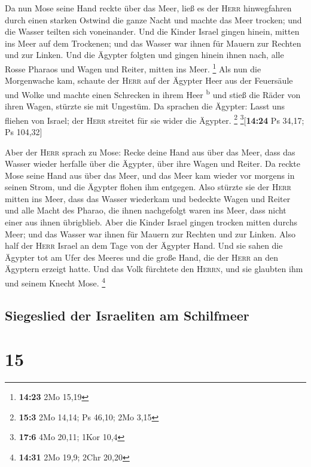  Da nun Mose seine Hand reckte über das Meer, ließ es der
\textsc{Herr} hinwegfahren durch einen starken Ostwind die ganze Nacht
und machte das Meer trocken; und die Wasser teilten sich voneinander.
 Und die Kinder Israel gingen hinein, mitten ins Meer auf
dem Trockenen; und das Wasser war ihnen für Mauern zur Rechten und zur
Linken.  Und die Ägypter folgten und gingen hinein ihnen
nach, alle Rosse Pharaos und Wagen und Reiter, mitten ins Meer.
\footnote{\textbf{14:23} 2Mo 15,19}  Als nun die
Morgenwache kam, schaute der \textsc{Herr} auf der Ägypter Heer aus der
Feuersäule und Wolke und machte einen Schrecken in ihrem Heer
\textsuperscript{b}  und stieß die Räder von ihren Wagen,
stürzte sie mit Ungestüm. Da sprachen die Ägypter: Lasst uns fliehen von
Israel; der \textsc{Herr} streitet für sie wider die Ägypter.
\footnote{\textbf{15:3} 2Mo 14,14; Ps 46,10; 2Mo 3,15}
\footnote{\textbf{17:6} 4Mo 20,11; 1Kor 10,4}{[}\textbf{14:24} Ps 34,17;
Ps 104,32{]}

 Aber der \textsc{Herr} sprach zu Mose: Recke deine Hand
aus über das Meer, dass das Wasser wieder herfalle über die Ägypter,
über ihre Wagen und Reiter.  Da reckte Mose seine Hand
aus über das Meer, und das Meer kam wieder vor morgens in seinen Strom,
und die Ägypter flohen ihm entgegen. Also stürzte sie der \textsc{Herr}
mitten ins Meer,  dass das Wasser wiederkam und bedeckte
Wagen und Reiter und alle Macht des Pharao, die ihnen nachgefolgt waren
ins Meer, dass nicht einer aus ihnen übrigblieb.  Aber
die Kinder Israel gingen trocken mitten durchs Meer; und das Wasser war
ihnen für Mauern zur Rechten und zur Linken.  Also half
der \textsc{Herr} Israel an dem Tage von der Ägypter Hand. Und sie sahen
die Ägypter tot am Ufer des Meeres  und die große Hand,
die der \textsc{Herr} an den Ägyptern erzeigt hatte. Und das Volk
fürchtete den \textsc{Herrn}, und sie glaubten ihm und seinem Knecht
Mose. \footnote{\textbf{14:31} 2Mo 19,9; 2Chr 20,20}

\hypertarget{siegeslied-der-israeliten-am-schilfmeer}{%
\subsection{Siegeslied der Israeliten am
Schilfmeer}\label{siegeslied-der-israeliten-am-schilfmeer}}

\hypertarget{section-14}{%
\section{15}\label{section-14}}

